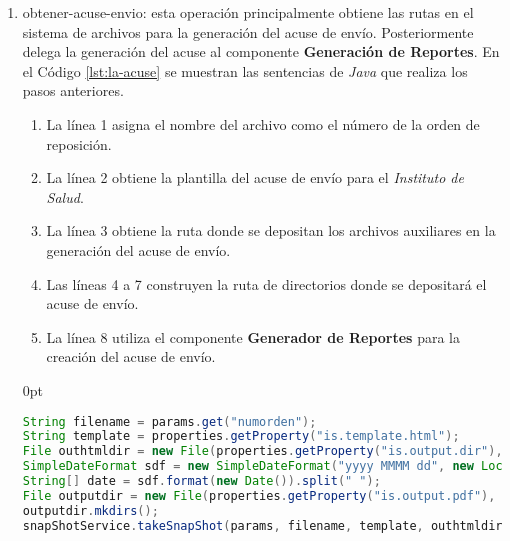 \begin{enumerate}
\begin{adjustwidth}{\listingfixwidth}{0pt}
\begin{lstlisting}[language=Java, caption={Método para calcular las fechas de fabricación y caducidad.}, captionpos=b, label={lst:la-dates}]
	return fechas;
}
	\end{lstlisting}
	\end{adjustwidth}
	\item obtener-acuse-envio: esta operación principalmente obtiene las rutas en el sistema de archivos para la generación del acuse de envío. Posteriormente delega la generación del acuse al componente \textbf{Generación de Reportes}. En el Código \ref{lst:la-acuse} se muestran las sentencias de \textit{Java} que realiza los pasos anteriores.
	\begin{enumerate}
		\item La línea 1 asigna el nombre del archivo como el número de la orden de reposición.
		\item La línea 2 obtiene la plantilla del acuse de envío para el \textit{Instituto de Salud}.
		\item La línea 3 obtiene la ruta donde se depositan los archivos auxiliares en la generación del acuse de envío.
		\item Las líneas 4 a 7 construyen la ruta de directorios donde se depositará el acuse de envío.
		\item La línea 8 utiliza el componente \textbf{Generador de Reportes} para la creación del acuse de envío.
	\end{enumerate}
	\begin{adjustwidth}{\listingfixwidth}{0pt}
	\begin{lstlisting}[language=Java, caption={Generación del acuse de envío.}, captionpos=b, label={lst:la-acuse}]
String filename = params.get("numorden");
String template = properties.getProperty("is.template.html");
File outhtmldir = new File(properties.getProperty("is.output.dir"), filename + ".html");
SimpleDateFormat sdf = new SimpleDateFormat("yyyy MMMM dd", new Locale("es", "MX"));
String[] date = sdf.format(new Date()).split(" ");
File outputdir = new File(properties.getProperty("is.output.pdf"), String.format(REPORT_DIR_TMPL, date[0], date[1], date[2]));
outputdir.mkdirs();
snapShotService.takeSnapShot(params, filename, template, outhtmldir, outputdir);
	\end{lstlisting}
	\end{adjustwidth}
\end{enumerate}

